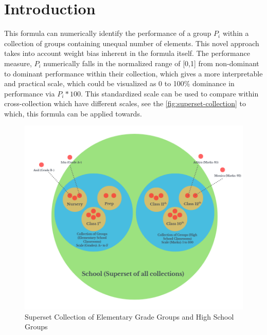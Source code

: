 \documentclass[a4paper,fleqn,review]{cas-sc}
\begin{document}
\section{Introduction}
This formula can numerically identify the performance of a group $P_i$ within a collection of groups containing unequal number of elements. This novel approach takes into account weight bias inherent in the formula itself. The performance measure, $P_i$ numerically falls in the normalized range of [0,1] from non-dominant to dominant performance within their collection, which gives a more interpretable and practical scale, which could be visualized as 0 to 100\% dominance in performance via $P_i * 100$. 
This standardized scale can be used to compare within cross-collection which have different scales, see the \autoref{fig:superset-collection} to which, this formula can be applied towards.
\begin{figure}
	\centering   
    \includegraphics [scale=0.5]{superset_collection.png}
    \caption{Superset Collection of Elementary Grade Groups and High School Groups}
    \label{fig:superset-collection}
\end{figure}
\end{document}
